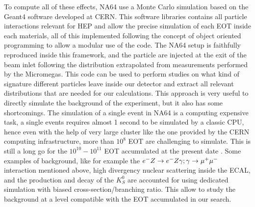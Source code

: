 To compute all of these effects, NA64 use a Monte Carlo simulation based on the Geant4 software \cite{AGOSTINELLI2003250,1610988} developed at CERN. This software libraries contains all particle interactions relevant for HEP and allow the precise simulation of each EOT inside each materials, all of this implemented following the concept of object oriented programming to allow a modular use of the code. The NA64 setup is faithfully reproduced inside this framework, and the particle are injected at the exit of the beam inlet following the distribution extrapolated from measurements performed by the Micromegas. This code can be used to perform studies on what kind of signature different particles leave inside our detector and extract all relevant distributions that are needed for our calculations. This approach is very useful to directly simulate the background of the experiment, but it also has some shortcomings. The simulation of a single event in NA64 is a computing expensive task, a single events requires almost 1 second to be simulated by a classic CPU, hence even with the help of very large cluster like the one provided by the CERN computing infrastructure, more than $10^8$ EOT are challenging to simulate. This is still a long go for the $10^{10}-10^{11}$ EOT accumulated at the present date \cite{Banerjee:2019hmi,NA64:2019imj}. Some examples of background, like for example the $e^- Z \to e^- Z \gamma; \gamma \to \mu^+ \mu^-$ interaction mentioned above, high divergency nuclear scattering inside the ECAL, and the production and decay of the $K^0_S$ are accounted for using dedicated simulation with biased cross-section/branching ratio. This allow to study the background at a level compatible with the EOT accumulated in our search.

